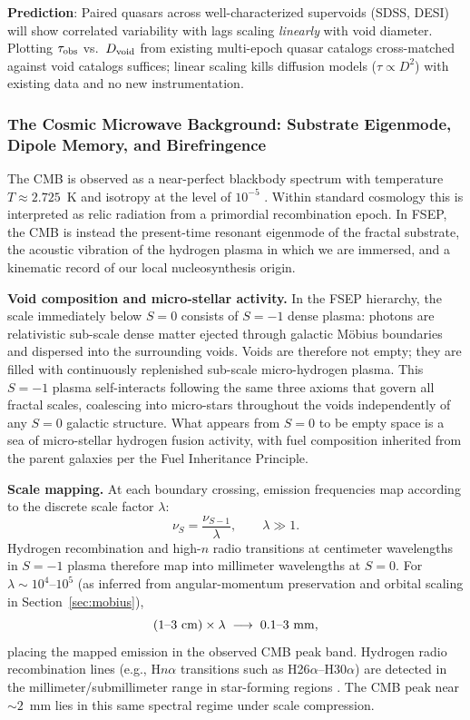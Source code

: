 \documentclass[11pt,letterpaper]{article}
\begin{document}
\textbf{Prediction}: Paired quasars across well-characterized supervoids (SDSS,
DESI) will show correlated variability with lags scaling \textit{linearly} with
void diameter. Plotting $\tau_{\rm obs}$ vs.\ $D_{\rm void}$ from existing
multi-epoch quasar catalogs cross-matched against void catalogs suffices; linear
scaling kills diffusion models ($\tau \propto D^2$) with existing data and no new
instrumentation.

\subsubsection{The Cosmic Microwave Background: Substrate Eigenmode, Dipole Memory,
and Birefringence}
\label{sec:cmb}

The CMB is observed as a near-perfect blackbody spectrum with temperature
$T \approx 2.725$~K and isotropy at the level of $10^{-5}$ \cite{Planck2014}.
Within standard cosmology this is interpreted as relic radiation from a primordial
recombination epoch. In FSEP, the CMB is instead the present-time resonant
eigenmode of the fractal substrate, the acoustic vibration of the hydrogen plasma
in which we are immersed, and a kinematic record of our local nucleosynthesis
origin.

\medskip
\noindent\textbf{Void composition and micro-stellar activity.}
In the FSEP hierarchy, the scale immediately below $S{=}0$ consists of $S{=}{-1}$
dense plasma: photons are relativistic sub-scale dense matter ejected through
galactic M\"obius boundaries and dispersed into the surrounding voids. Voids are
therefore not empty; they are filled with continuously replenished sub-scale
micro-hydrogen plasma. This $S{=}{-1}$ plasma self-interacts following the same
three axioms that govern all fractal scales, coalescing into micro-stars throughout
the voids independently of any $S{=}0$ galactic structure. What appears from
$S{=}0$ to be empty space is a sea of micro-stellar hydrogen fusion activity, with
fuel composition inherited from the parent galaxies per the Fuel Inheritance
Principle.

\medskip
\noindent\textbf{Scale mapping.}
At each boundary crossing, emission frequencies map according to the discrete scale
factor $\lambda$:
\begin{equation}
\nu_{S} = \frac{\nu_{S-1}}{\lambda}, \qquad \lambda \gg 1.
\end{equation}
Hydrogen recombination and high-$n$ radio transitions at centimeter wavelengths in
$S{=}{-1}$ plasma therefore map into millimeter wavelengths at $S{=}0$. For
$\lambda \sim 10^{4}$--$10^{5}$ (as inferred from angular-momentum preservation and
orbital scaling in Section~\ref{sec:mobius}),
\begin{equation}
(1\text{--}3~{\rm cm}) \times \lambda \;\longrightarrow\; 0.1\text{--}3~{\rm mm},
\end{equation}
placing the mapped emission in the observed CMB peak band. Hydrogen radio
recombination lines (e.g., H$n\alpha$ transitions such as H26$\alpha$--H30$\alpha$)
are detected in the millimeter/submillimeter range in star-forming regions
\cite{ATLASGAL2014}. The CMB peak near $\sim 2$~mm lies in this same spectral
regime under scale compression.
\end{document}

